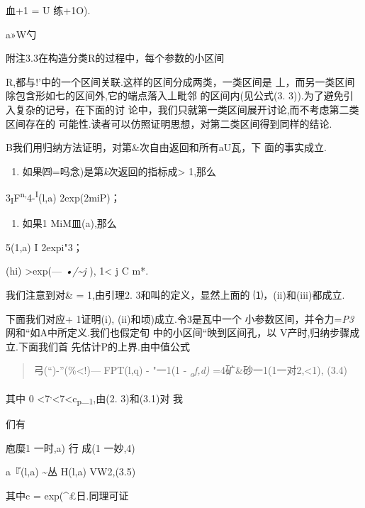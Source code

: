 血+1 = U 练+1O).

a»W勺

附注3.3在构造分类R的过程中，每个参数的小区间

R,都与!'中的一个区间关联.这样的区间分成两类，一类区间是
丄，而另一类区间除包含形如七的区间外,它的端点落入丄毗邻
的区间内(见公式(3. 3)).为了避免引入复杂的记号，在下面的讨
论中，我们只就第一类区间展开讨论,而不考虑第二类区间存在的
可能性.读者可以仿照证明思想，对第二类区间得到同样的结论.

B我们用归纳方法证明，对第\&次自由返回和所有aU瓦，下 面的事实成立.

\begin{enumerate}
\def\labelenumi{(\roman{enumi})}
\item
  如果㈣=吗念)是第\emph{k}次返回的指标成\textgreater{} 1,那么
\end{enumerate}

\textbar{}3\textsubscript{I}F\textsuperscript{n,}4-\textsuperscript{I}(l,a)\textbar{}
2exp(2miP)；

\begin{enumerate}
\def\labelenumi{(\roman{enumi})}
\setcounter{enumi}{1}
\item
  如果1 MiM皿(a),那么
\end{enumerate}

5(1,a) I 2expi"3；

(hi) \textgreater{}exp(--- \emph{•/\textasciitilde{}j} ), 1\textless{} j
C m*.

我们注意到对\& = 1,由引理2. 3和叫的定义，显然上面的
⑴，(ii)和(iii)都成立.

下面我们对应+ 1证明(i), (ii)和顷)成立.令3是瓦中一个
小参数区间，并令力=\emph{P3} 网和``如A中所定义.我们也假定旬
中的小区间``映到区间孔，以\textbar{} V产时,归纳步骤成立.下面我们首
先估计P的上界.由中值公式

\begin{quote}
弓(``)-''(\%\textless{}!)--- FPT(l,q) - "一1(1 -
\emph{\textsubscript{a}f,d)} =4矿\&砂一1(1一对2,\textless{}1), (3.4)
\end{quote}

其中 0
\textless{}7\textsuperscript{,}\textless{}7\textless{}c\textsubscript{p}\_\textsubscript{1},由(2.
3)和(3.1)对 我

们有

{庖糜1 一时,a)\textbar{}} 行 {成(1 一妙,4)\textbar{}}

\textbar{}a『(l,a)\textbar{} \textasciitilde{}丛
\textbar{}H(l,a)\textbar{} VW2,(3.5)

其中c = exp(\^{}£日.同理可证

